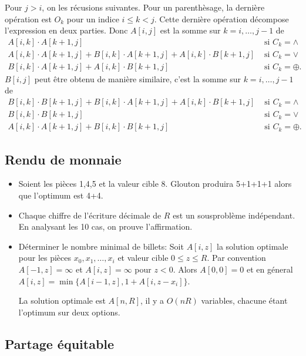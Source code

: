 \documentclass[12pt]{article}
\begin{document}
Pour $j>i$, on les récusions suivantes.
Pour un parenthèsage, la dernière opération est $O_k$ pour un indice $i\leq k < j$.
Cette dernière opération décompose l'expression en deux parties. Donc
$A[i,j]$ est la somme sur $k=i,\ldots,j-1$ de
\begin{align*}
    A[i,k]\cdot A[k+1,j] & \textrm{ si } C_k=\wedge \\
    A[i,k]\cdot A[k+1,j] + B[i,k]\cdot A[k+1,j] + A[i,k]\cdot B[k+1,j] & \textrm{ si } C_k=\vee \\
    B[i,k]\cdot A[k+1,j] + A[i,k]\cdot B[k+1,j] & \textrm{ si } C_k=\oplus.
\end{align*}
$B[i,j]$ peut être obtenu de manière similaire, c'est la somme sur $k=i,\ldots,j-1$ de
\begin{align*}
    B[i,k]\cdot B[k+1,j] + B[i,k]\cdot A[k+1,j] + A[i,k]\cdot B[k+1,j] & \textrm{ si } C_k=\wedge \\
    B[i,k]\cdot B[k+1,j] & \textrm{ si } C_k=\vee \\
    A[i,k]\cdot A[k+1,j] + B[i,k]\cdot B[k+1,j] & \textrm{ si } C_k=\oplus.
\end{align*}

\subsection{Rendu de monnaie}

\begin{itemize}
    \item Soient les pièces 1,4,5 et la valeur cible 8. Glouton produira 5+1+1+1 alors que l'optimum est 4+4.
    \item Chaque chiffre de l'écriture décimale de $R$ est un sousproblème indépendant.  En analysant les 10 cas, on prouve l'affirmation.
    \item
    Déterminer le nombre minimal de billets: 
    Soit $A[i,z]$ la solution optimale pour les pièces $x_0,x_1,\ldots,x_i$ et valeur cible $0\leq z\leq R$.
    Par convention $A[-1,z]=\infty$ et $A[i,z]=\infty$ pour $z<0$.
    Alors $A[0,0]=0$ et en géneral $A[i,z]=\min\{A[i-1,z],1+A[i,z-x_i]\}$.  

    La solution optimale est $A[n,R]$, il y a $O(nR)$ variables, chacune étant l'optimum sur deux options. 
\end{itemize}

\subsection{Partage équitable}
\end{document}
